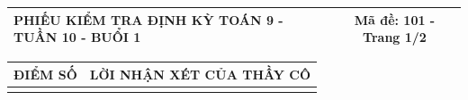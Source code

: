 \documentclass[12pt,a4paper]{article}
\begin{document}
\pagestyle{empty}
\noindent
\begin{tabularx}{\linewidth}{|X|c|}
\hline
\textbf{PHIẾU KIỂM TRA ĐỊNH KỲ TOÁN 9 - TUẦN 10 - BUỔI 1} & \textbf{Mã đề: 101 - Trang 1/2} \\
\hline
\end{tabularx}

\vspace{1.0mm}

\noindent
\begin{tabularx}{\linewidth}{|p{3.2cm}|X|}
\hline
\centering\textbf{ĐIỂM SỐ} & \centering\textbf{LỜI NHẬN XÉT CỦA THẦY CÔ} \tabularnewline
\hline
\rule{0pt}{1.8cm} & \tabularnewline
\hline
\end{tabularx}
\end{document}
